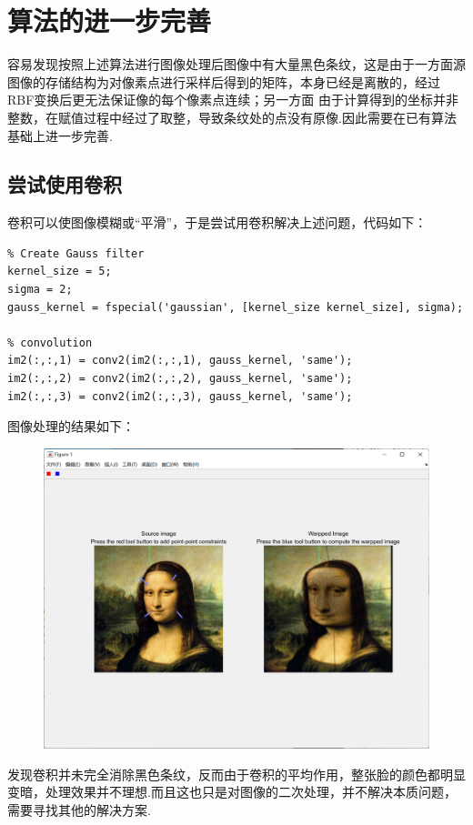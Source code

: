 \documentclass[12pt]{article}
\begin{document}
\section{算法的进一步完善}

容易发现按照上述算法进行图像处理后图像中有大量黑色条纹，这是由于一方面源图像的存储结构为对像素点进行采样后得到的矩阵，本身已经是离散的，经过RBF变换后更无法保证像的每个像素点连续；另一方面
由于计算得到的坐标并非整数，在赋值过程中经过了取整，导致条纹处的点没有原像.因此需要在已有算法基础上进一步完善.

\subsection{尝试使用卷积}
卷积可以使图像模糊或“平滑”，于是尝试用卷积解决上述问题，代码如下：
\begin{lstlisting}
% Create Gauss filter
kernel_size = 5;
sigma = 2;
gauss_kernel = fspecial('gaussian', [kernel_size kernel_size], sigma);

% convolution
im2(:,:,1) = conv2(im2(:,:,1), gauss_kernel, 'same');
im2(:,:,2) = conv2(im2(:,:,2), gauss_kernel, 'same');
im2(:,:,3) = conv2(im2(:,:,3), gauss_kernel, 'same');
\end{lstlisting}
图像处理的结果如下：
\begin{figure}[H]
    \centering
    \includegraphics[scale=0.4]{pic3.png}
\end{figure}
发现卷积并未完全消除黑色条纹，反而由于卷积的平均作用，整张脸的颜色都明显变暗，处理效果并不理想.而且这也只是对图像的二次处理，并不解决本质问题，需要寻找其他的解决方案.
\end{document}
